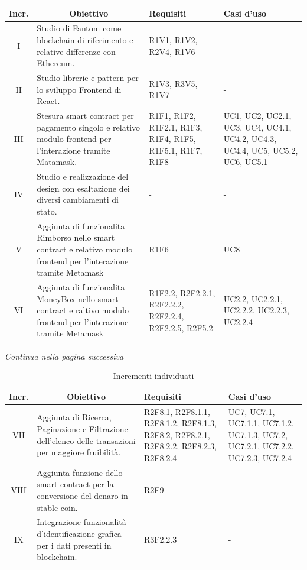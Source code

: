 \begin{table}[H]
  \centering
  \renewcommand{\arraystretch}{1.8}
  \begin{tabular}{c|p{6cm}|p{3cm}|p{3cm}}
    \rowcolor[HTML]{125E28}
    \color[HTML]{FFFFFF}\textbf{Incr.}
    & \multicolumn{1}{c}{\color[HTML]{FFFFFF}\textbf{Obiettivo}}
    & \color[HTML]{FFFFFF}\textbf{Requisiti}
    & \color[HTML]{FFFFFF}\textbf{Casi d'uso}\\
    \hline
    I	& Studio di Fantom come blockchain di riferimento e relative differenze con Ethereum.	& R1V1, R1V2, R2V4, R1V6 & - \\
    II & Studio librerie e pattern per lo sviluppo Frontend di React. & R1V3, R3V5, R1V7 & - \\
    III	& Stesura smart contract per pagamento singolo e relativo modulo frontend per l'interazione tramite Matamask. & R1F1, R1F2, R1F2.1, R1F3, R1F4, R1F5, R1F5.1, R1F7, R1F8 & UC1, UC2, UC2.1, UC3, UC4, UC4.1, UC4.2, UC4.3, UC4.4, UC5, UC5.2, UC6, UC5.1 \\
    IV & Studio e realizzazione del design con esaltazione dei diversi cambiamenti di stato. &	- & - \\
    V	& Aggiunta di funzionalita Rimborso nello smart contract e relativo modulo frontend per l'interazione tramite Metamask  & R1F6 & UC8 \\
    VI & Aggiunta di funzionalita MoneyBox nello smart contract e raltivo modulo frontend per l'interazione tramite Metamask  & R1F2.2, R2F2.2.1, R2F2.2.2, R2F2.2.4, R2F2.2.5, R2F5.2 & UC2.2, UC2.2.1, UC2.2.2, UC2.2.3, UC2.2.4 \\
  \end{tabular}
\end{table}
\begin{center}
  \textit{\small Continua nella pagina successiva}
\end{center}
\begin{table}[H]
  \centering
  \renewcommand{\arraystretch}{1.8}
  \begin{tabular}{c|p{6cm}|p{3cm}|p{3cm}}
    \rowcolor[HTML]{125E28}
    \color[HTML]{FFFFFF}\textbf{Incr.}
    & \multicolumn{1}{c}{\color[HTML]{FFFFFF}\textbf{Obiettivo}}
    & \color[HTML]{FFFFFF}\textbf{Requisiti}
    & \color[HTML]{FFFFFF}\textbf{Casi d'uso}\\
    \hline
    VII	& Aggiunta di Ricerca, Paginazione e Filtrazione dell’elenco delle transazioni per maggiore fruibilità. & R2F8.1, R2F8.1.1, R2F8.1.2, R2F8.1.3, R2F8.2, R2F8.2.1, R2F8.2.2, R2F8.2.3, R2F8.2.4 & UC7, UC7.1, UC7.1.1, UC7.1.2, UC7.1.3, UC7.2, UC7.2.1, UC7.2.2, UC7.2.3, UC7.2.4\\
    VIII & Aggiunta funzione dello smart contract per la conversione del denaro in stable coin. & R2F9 & - \\
    IX & Integrazione funzionalità d’identificazione grafica per i dati presenti in blockchain. & R3F2.2.3  & - \\
  \end{tabular}
  \caption{Incrementi individuati}
\end{table}